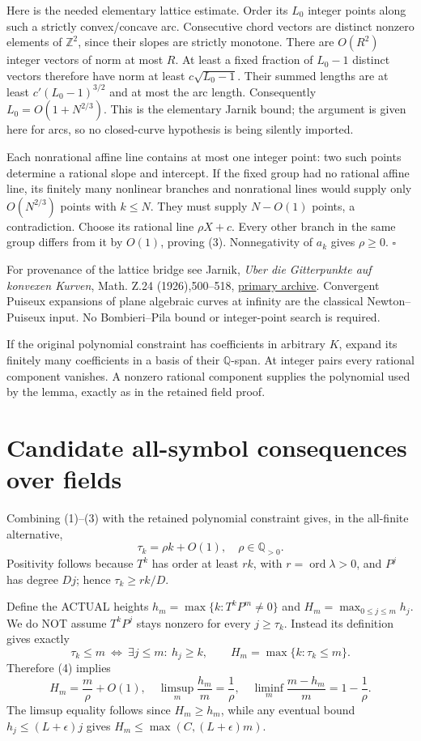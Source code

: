 \documentclass{article}
\newcommand{\Q}{\mathbb Q}\newcommand{\Z}{\mathbb Z}\newcommand{\N}{\mathbb N}
\begin{document}
Here is the needed elementary lattice estimate. Order its $L_0$ integer points along such a strictly convex/concave arc. Consecutive chord vectors are distinct nonzero elements of $\Z^2$, since their slopes are strictly monotone. There are $O(R^2)$ integer vectors of norm at most $R$. At least a fixed fraction of $L_0-1$ distinct vectors therefore have norm at least $c\sqrt{L_0-1}$. Their summed lengths are at least $c'(L_0-1)^{3/2}$ and at most the arc length. Consequently $L_0=O(1+N^{2/3})$. This is the elementary Jarnik bound; the argument is given here for arcs, so no closed-curve hypothesis is being silently imported.

Each nonrational affine line contains at most one integer point: two such points determine a rational slope and intercept. If the fixed group had no rational affine line, its finitely many nonlinear branches and nonrational lines would supply only $O(N^{2/3})$ points with $k\le N$. They must supply $N-O(1)$ points, a contradiction. Choose its rational line $\rho X+c$. Every other branch in the same group differs from it by $O(1)$, proving (3). Nonnegativity of $a_k$ gives $\rho\ge0$. \hfill$\square$

For provenance of the lattice bridge see Jarnik, \emph{Uber die Gitterpunkte auf konvexen Kurven}, Math. Z.24 (1926),500--518, \href{https://www.dml.cz/handle/10338.dmlcz/500690}{primary archive}. Convergent Puiseux expansions of plane algebraic curves at infinity are the classical Newton--Puiseux input. No Bombieri--Pila bound or integer-point search is required.

If the original polynomial constraint has coefficients in arbitrary $K$, expand its finitely many coefficients in a basis of their $\Q$-span. At integer pairs every rational component vanishes. A nonzero rational component supplies the polynomial used by the lemma, exactly as in the retained field proof.

\section{Candidate all-symbol consequences over fields}
Combining (1)--(3) with the retained polynomial constraint gives, in the all-finite alternative,
\[
               \boxed{\tau_k=\rho k+O(1),\quad\rho\in\Q_{>0}.} \tag{4}
\]
Positivity follows because $T^k$ has order at least $rk$, with $r=\operatorname{ord}\lambda>0$, and $P^j$ has degree $Dj$; hence $\tau_k\ge rk/D$.

Define the ACTUAL heights $h_m=\max\{k:T^kP^m\ne0\}$ and $H_m=\max_{0\le j\le m}h_j$. We do NOT assume $T^kP^j$ stays nonzero for every $j\ge\tau_k$. Instead its definition gives exactly
\[
 \tau_k\le m\ \Longleftrightarrow\ \exists j\le m:\ h_j\ge k,
 \qquad H_m=\max\{k:\tau_k\le m\}.
\]
Therefore (4) implies
\[
 H_m=\frac m\rho+O(1),\quad
 \limsup_m\frac{h_m}m=\frac1\rho,\quad
 \liminf_m\frac{m-h_m}m=1-\frac1\rho.                    \tag{5}
\]
The limsup equality follows since $H_m\ge h_m$, while any eventual bound $h_j\le(L+\epsilon)j$ gives $H_m\le\max(C,(L+\epsilon)m)$.
\end{document}

